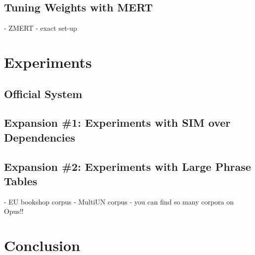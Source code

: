 \documentclass[11pt]{article}
\begin{document}

\subsection{Tuning Weights with MERT}
\label{sec:mert}

- ZMERT \cite{zaidan:zmert:09}
- exact set-up

\section{Experiments}
\label{sec:exp}

\subsection{Official System}
\label{sec:exp:official}

\cite{nltkbook}

\subsection{Expansion \#1: Experiments with SIM over Dependencies}
\label{sec:exp:sim}

\subsection{Expansion \#2: Experiments with Large Phrase Tables}
\label{sec:exp:large-pts}

- EU bookshop corpus
- MultiUN corpus
- you can find so many corpora on Opus!! \cite{tiedemann:12}

\section{Conclusion} 



\end{document}
